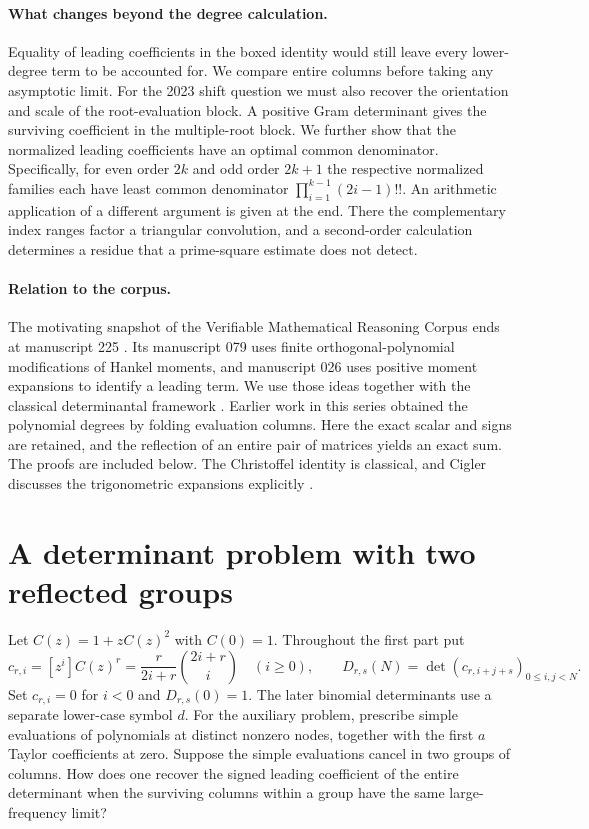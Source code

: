 \documentclass[11pt,a4paper]{article}
\begin{document}
\paragraph{What changes beyond the degree calculation.}
Equality of leading coefficients in the boxed identity would still leave every lower-degree term to be accounted for. We compare entire columns before taking any asymptotic limit. For the 2023 shift question we must also recover the orientation and scale of the root-evaluation block. A positive Gram determinant gives the surviving coefficient in the multiple-root block. We further show that the normalized leading coefficients have an optimal common denominator. Specifically, for even order $2k$ and odd order $2k+1$ the respective normalized families each have least common denominator $\prod_{i=1}^{k-1}(2i-1)!!$. An arithmetic application of a different argument is given at the end. There the complementary index ranges factor a triangular convolution, and a second-order calculation determines a residue that a prime-square estimate does not detect.

\paragraph{Relation to the corpus.}
The motivating snapshot of the Verifiable Mathematical Reasoning Corpus ends at manuscript 225 \cite{VMRC}. Its manuscript 079 uses finite orthogonal-polynomial modifications of Hankel moments, and manuscript 026 uses positive moment expansions to identify a leading term. We use those ideas together with the classical determinantal framework \cite{Krat}. Earlier work in this series obtained the polynomial degrees by folding evaluation columns. Here the exact scalar and signs are retained, and the reflection of an entire pair of matrices yields an exact sum. The proofs are included below. The Christoffel identity is classical, and Cigler discusses the trigonometric expansions explicitly \cite{C23,MO}.

\section{A determinant problem with two reflected groups}
Let $C(z)=1+zC(z)^2$ with $C(0)=1$. Throughout the first part put
\[
 c_{r,i}=[z^i]C(z)^r=\frac{r}{2i+r}\binom{2i+r}{i}\quad(i\ge0),\qquad
 D_{r,s}(N)=\det(c_{r,i+j+s})_{0\le i,j<N}.
\]
Set $c_{r,i}=0$ for $i<0$ and $D_{r,s}(0)=1$. The later binomial determinants use a separate lower-case symbol $d$.
For the auxiliary problem, prescribe simple evaluations of polynomials at distinct nonzero nodes, together with the first $a$ Taylor coefficients at zero. Suppose the simple evaluations cancel in two groups of columns. How does one recover the signed leading coefficient of the entire determinant when the surviving columns within a group have the same large-frequency limit?
\end{document}
